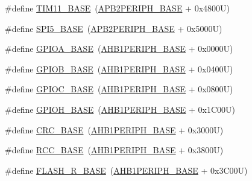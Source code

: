 \begin{DoxyCompactItemize}
\item 
\#define \hyperlink{group___peripheral__registers__structures_ga3a4a06bb84c703084f0509e105ffaf1d}{T\+I\+M11\+\_\+\+B\+A\+SE}~(\hyperlink{group___peripheral__memory__map_ga25b99d6065f1c8f751e78f43ade652cb}{A\+P\+B2\+P\+E\+R\+I\+P\+H\+\_\+\+B\+A\+SE} + 0x4800\+U)
\item 
\#define \hyperlink{group___peripheral__registers__structures_gac1c58d33414e167d478ecd0e31331dfa}{S\+P\+I5\+\_\+\+B\+A\+SE}~(\hyperlink{group___peripheral__memory__map_ga25b99d6065f1c8f751e78f43ade652cb}{A\+P\+B2\+P\+E\+R\+I\+P\+H\+\_\+\+B\+A\+SE} + 0x5000\+U)
\item 
\#define \hyperlink{group___peripheral__registers__structures_gad7723846cc5db8e43a44d78cf21f6efa}{G\+P\+I\+O\+A\+\_\+\+B\+A\+SE}~(\hyperlink{group___peripheral__memory__map_ga811a9a4ca17f0a50354a9169541d56c4}{A\+H\+B1\+P\+E\+R\+I\+P\+H\+\_\+\+B\+A\+SE} + 0x0000\+U)
\item 
\#define \hyperlink{group___peripheral__registers__structures_gac944a89eb789000ece920c0f89cb6a68}{G\+P\+I\+O\+B\+\_\+\+B\+A\+SE}~(\hyperlink{group___peripheral__memory__map_ga811a9a4ca17f0a50354a9169541d56c4}{A\+H\+B1\+P\+E\+R\+I\+P\+H\+\_\+\+B\+A\+SE} + 0x0400\+U)
\item 
\#define \hyperlink{group___peripheral__registers__structures_ga26f267dc35338eef219544c51f1e6b3f}{G\+P\+I\+O\+C\+\_\+\+B\+A\+SE}~(\hyperlink{group___peripheral__memory__map_ga811a9a4ca17f0a50354a9169541d56c4}{A\+H\+B1\+P\+E\+R\+I\+P\+H\+\_\+\+B\+A\+SE} + 0x0800\+U)
\item 
\#define \hyperlink{group___peripheral__registers__structures_gaee4716389f3a1c727495375b76645608}{G\+P\+I\+O\+H\+\_\+\+B\+A\+SE}~(\hyperlink{group___peripheral__memory__map_ga811a9a4ca17f0a50354a9169541d56c4}{A\+H\+B1\+P\+E\+R\+I\+P\+H\+\_\+\+B\+A\+SE} + 0x1\+C00\+U)
\item 
\#define \hyperlink{group___peripheral__registers__structures_ga656a447589e785594cbf2f45c835ad7e}{C\+R\+C\+\_\+\+B\+A\+SE}~(\hyperlink{group___peripheral__memory__map_ga811a9a4ca17f0a50354a9169541d56c4}{A\+H\+B1\+P\+E\+R\+I\+P\+H\+\_\+\+B\+A\+SE} + 0x3000\+U)
\item 
\#define \hyperlink{group___peripheral__registers__structures_ga0e681b03f364532055d88f63fec0d99d}{R\+C\+C\+\_\+\+B\+A\+SE}~(\hyperlink{group___peripheral__memory__map_ga811a9a4ca17f0a50354a9169541d56c4}{A\+H\+B1\+P\+E\+R\+I\+P\+H\+\_\+\+B\+A\+SE} + 0x3800\+U)
\item 
\#define \hyperlink{group___peripheral__registers__structures_ga8e21f4845015730c5731763169ec0e9b}{F\+L\+A\+S\+H\+\_\+\+R\+\_\+\+B\+A\+SE}~(\hyperlink{group___peripheral__memory__map_ga811a9a4ca17f0a50354a9169541d56c4}{A\+H\+B1\+P\+E\+R\+I\+P\+H\+\_\+\+B\+A\+SE} + 0x3\+C00\+U)

\end{DoxyCompactItemize}
